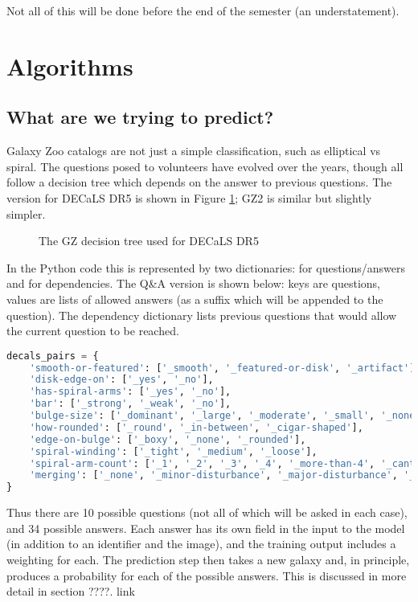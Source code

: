 \documentclass[preprint]{aastex631}
\newcommand{\todo}{\color{red}{TODO}\color{black}\hspace{2mm}}
\begin{document}
Not all of this will be done before the end of the semester (an understatement).

\section{Algorithms} \label{algorithms}

\subsection{What are we trying to predict?}

Galaxy Zoo catalogs are not just a simple classification, such as elliptical vs spiral. The questions posed to volunteers have evolved over the years, though all follow a decision tree which depends on the answer to previous questions. The version for DECaLS DR5 is shown in Figure \ref{fig:decals_decisions}; GZ2 is similar but slightly simpler.

\begin{figure}[htb!]
	\caption{The GZ decision tree used for DECaLS DR5
		\label{fig:decals_decisions}}
\end{figure}

In the Python code this is represented by two dictionaries: for questions/answers and for dependencies. The Q\&A version is shown below: keys are questions, values are lists of allowed answers (as a suffix which will be appended to the question). The dependency dictionary lists previous questions that would allow the current question to be reached.


\begin{lstlisting}[language=Python]
decals_pairs = {
	'smooth-or-featured': ['_smooth', '_featured-or-disk', '_artifact'],
	'disk-edge-on': ['_yes', '_no'],
	'has-spiral-arms': ['_yes', '_no'],
	'bar': ['_strong', '_weak', '_no'],
	'bulge-size': ['_dominant', '_large', '_moderate', '_small', '_none'],
	'how-rounded': ['_round', '_in-between', '_cigar-shaped'],
	'edge-on-bulge': ['_boxy', '_none', '_rounded'],
	'spiral-winding': ['_tight', '_medium', '_loose'],
	'spiral-arm-count': ['_1', '_2', '_3', '_4', '_more-than-4', '_cant-tell'],
	'merging': ['_none', '_minor-disturbance', '_major-disturbance', '_merger']
}
\end{lstlisting}

Thus there are 10 possible questions (not all of which will be asked in each case), and 34 possible answers. Each answer has its own field in the input to the model (in addition to an identifier and the image), and the training output includes a weighting for each. The prediction step then takes a new galaxy and, in principle, produces a probability for each of the possible answers. This is discussed in more detail in section ????.
\todo link
\end{document}
